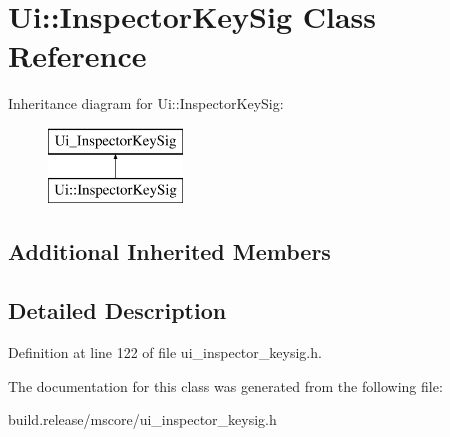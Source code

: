 \hypertarget{class_ui_1_1_inspector_key_sig}{}\section{Ui\+:\+:Inspector\+Key\+Sig Class Reference}
\label{class_ui_1_1_inspector_key_sig}
Inheritance diagram for Ui\+:\+:Inspector\+Key\+Sig\+:\begin{figure}[H]
\begin{center}
\leavevmode
\includegraphics[height=2.000000cm]{class_ui_1_1_inspector_key_sig}
\end{center}
\end{figure}
\subsection*{Additional Inherited Members}


\subsection{Detailed Description}


Definition at line 122 of file ui\+\_\+inspector\+\_\+keysig.\+h.



The documentation for this class was generated from the following file\+:\begin{DoxyCompactItemize}
\item 
build.\+release/mscore/ui\+\_\+inspector\+\_\+keysig.\+h\end{DoxyCompactItemize}
